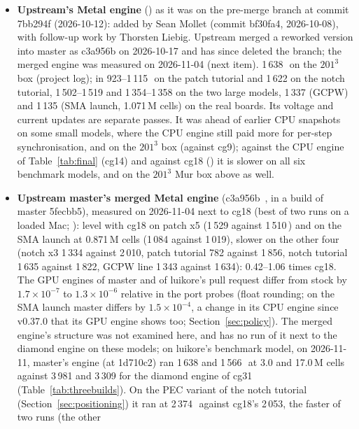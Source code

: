 \begin{itemize}
\item \textbf{Upstream's Metal engine} () as it was on the pre-merge  branch at
  commit 7bb294f (2026-10-12): added by Sean Mollet (commit bf30fa4, 2026-10-08), with follow-up work by Thorsten
  Liebig. Upstream merged a reworked version into master as c3a956b on 2026-10-17 and has since deleted the branch;
  the merged engine was measured on 2026-11-04 (next item). 1\,638\,\MC\ on the $201^3$ box (project log); in 
  923--1\,115\,\MC\ on the patch tutorial and 1\,622 on the notch tutorial, 1\,502--1\,519 and 1\,354--1\,358 on the
  two large models, 1\,337 (GCPW) and 1\,135 (SMA launch, 1.071\,M cells) on the real boards. Its voltage and current
  updates are separate passes. It was ahead of earlier CPU snapshots on some small models, where the CPU engine still paid more for
  per-step synchronisation, and on the $201^3$ box (against cg9); against the CPU engine of Table~\ref{tab:final}
  (cg14) and against cg18 () it is slower on all six benchmark models, and on the $201^3$
  Mur box above as well.
\item \textbf{Upstream master's merged Metal engine} (c3a956b~\cite{mollet235}, in a build of master 5fecbb5),
  measured on 2026-11-04 next to cg18 (best of two runs on a loaded Mac; ):
  level with cg18 on patch x5 (1\,529 against 1\,510\,\MC) and on the SMA launch at 0.871\,M cells (1\,084 against
  1\,019), slower on the other four (notch x3 1\,334 against 2\,010, patch tutorial 782 against 1\,856, notch tutorial
  1\,635 against 1\,822, GCPW line 1\,343 against 1\,634): 0.42--1.06 times cg18. The GPU engines of master and of
  luikore's pull request differ from stock by $1.7\times10^{-7}$ to $1.3\times10^{-6}$ relative in the port probes
  (float rounding; on the SMA launch master differs by $1.5\times10^{-4}$, a change in its CPU engine since v0.37.0
  that its GPU engine shows too; Section~\ref{sec:policy}). The merged engine's structure was not examined here, and
   has no run of it next to the diamond engine on these models; on luikore's benchmark model, on
  2026-11-11, master's  engine (at 1d710c2) ran 1\,638 and 1\,566\,\MC\ at 3.0 and 17.0\,M cells against
  3\,981 and 3\,309 for the diamond engine of cg31 (Table~\ref{tab:threebuilds}).
  On the PEC variant of the notch tutorial
  (Section~\ref{sec:positioning}) it ran at 2\,374\,\MC\ against cg18's 2\,053, the faster of two runs (the other

\end{itemize}
